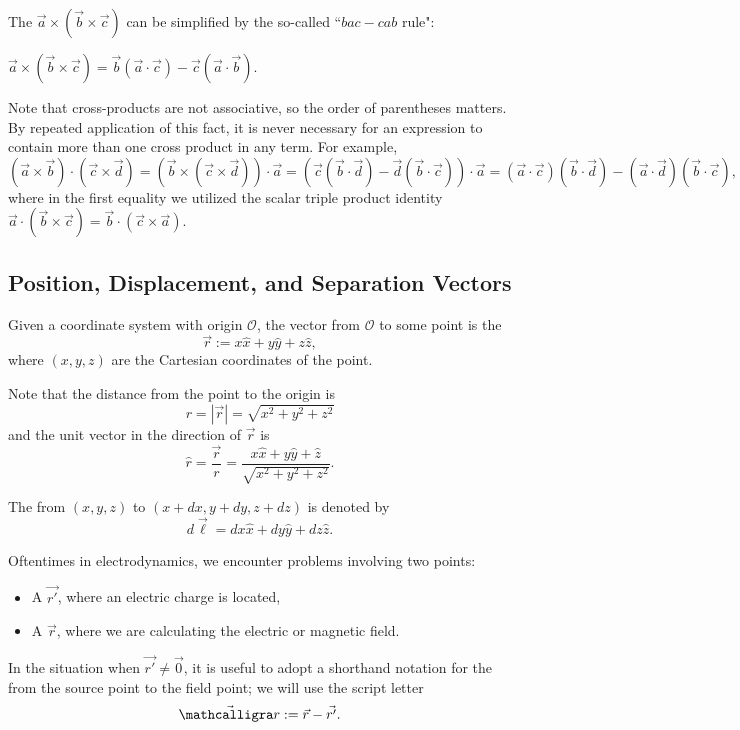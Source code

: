 The  $\vec{a}\times (\vec{b}\times \vec{c})$ can be simplified by the so-called ``$bac-cab$ rule":
\begin{claim}
$\vec{a}\times(\vec{b}\times\vec{c})=\vec{b}(\vec{a}\cdot\vec{c})-\vec{c}(\vec{a}\cdot\vec{b}).$
\end{claim}
Note that cross-products are not associative, so the order of parentheses matters. By repeated application of this fact, it is never necessary for an expression to contain more than one cross product in any term. For example,
\[(\vec{a}\times \vec{b})\cdot(\vec{c}\times\vec{d})=(\vec{b}\times(\vec{c}\times \vec{d}))\cdot \vec{a}=(\vec{c}(\vec{b}\cdot\vec{d})-\vec{d}(\vec{b}\cdot\vec{c}))\cdot\vec{a}=(\vec{a}\cdot\vec{c})(\vec{b}\cdot\vec{d})-(\vec{a}\cdot\vec{d})(\vec{b}\cdot\vec{c}),\]
where in the first equality we utilized the scalar triple product identity $\vec{a}\cdot(\vec{b}\times\vec{c})=\vec{b}\cdot(\vec{c}\times\vec{a})$.

\subsection{Position, Displacement, and Separation Vectors}

\begin{definition}
Given a coordinate system with origin $\mathcal{O}$, the vector from $\mathcal{O}$ to some point is the 
\[\vec{r}:=x\hat{x}+y\hat{y}+z\hat{z},\]
where $(x,y,z)$ are the Cartesian coordinates of the point. 
\end{definition}
Note that the distance from the point to the origin is
\[r=|\vec{r}|=\sqrt{x^2+y^2+z^2}\]
and the unit vector in the direction of $\vec{r}$ is 
\[\hat{r}=\frac{\vec{r}}{r}=\frac{x\hat{x}+y\hat{y}+\hat{z}}{\sqrt{x^2+y^2+z^2}}.\]

\begin{definition}
The  from $(x,y,z)$ to $(x+dx,y+dy,z+dz)$ is denoted by
\[d\vec{\ell}=dx\hat{x}+dy\hat{y}+dz\hat{z}.\]
\end{definition}
Oftentimes in electrodynamics, we encounter problems involving two points:
\begin{itemize}
    \item A  $\vec{r'}$, where an electric charge is located,
    \item A  $\vec{r}$, where we are calculating the electric or magnetic field.
\end{itemize}
In the situation when $\vec{r'}\neq \vec{0}$, it is useful to adopt a shorthand notation for the  from the source point to the field point; we will use the script letter
\[\vec{\scripty{r}}:=\vec{r}-\vec{r'}.\]

